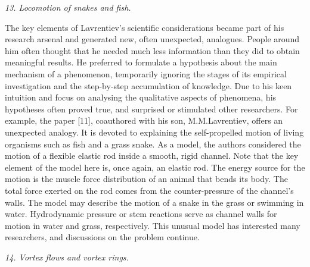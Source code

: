 \documentclass[%
 reprint,
onecolumn,
 amsmath,amssymb, aps,
]{revtex4-2}
\numberwithin{equation}{section}
\begin{document}
\textit{13. Locomotion of snakes and fish.}
\vspace{1mm}

The key elements of Lavrentiev's scientific considerations became part of his research arsenal and generated new, often unexpected, analogues.
People around him often thought that he needed much less information than they did to obtain meaningful results.
He preferred to formulate a hypothesis about the main mechanism of a phenomenon, temporarily ignoring the stages of its empirical investigation and the step-by-step accumulation of knowledge.
Due to his keen intuition and focus on analysing the qualitative aspects of phenomena, his hypotheses often proved true, and surprised or stimulated other researchers.
For example, the paper [11], coauthored with his son, M.M.Lavrentiev, offers an unexpected analogy.
It is devoted to explaining the self-propelled motion of living organisms such as fish and a grass snake.
As a model, the authors considered the motion of a flexible elastic rod inside a smooth, rigid channel.
Note that the key element of the model here is, once again, an elastic rod.
The energy source for the motion is the muscle force distribution of an animal that bends its body.
The total force exerted on the rod comes from the counter-pressure of the channel's walls.
The model may describe the motion of a snake in the grass or  swimming in water.
Hydrodynamic pressure or stem reactions serve as channel walls for motion in water and grass, respectively.
This unusual model has interested many researchers, and discussions on the problem continue.
\vspace{3mm}

\textit{14. Vortex flows and vortex rings.}
\vspace{1mm}
\end{document}
